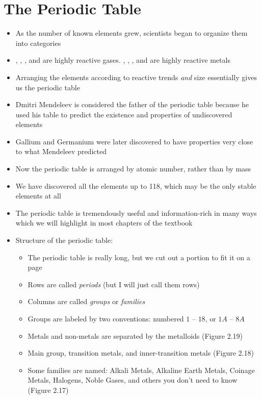 \documentclass[12pt, openany, letterpaper]{memoir}
\begin{document}
\section{The Periodic Table}
\begin{itemize}
	\item As the number of known elements grew, scientists began to organize them into categories
	\item {}, , , and  are highly reactive gases. , , , and  are highly reactive metals
	\item Arranging the elements according to reactive trends \emph{and} size essentially gives us the periodic table
	\item Dmitri Mendeleev is considered the father of the periodic table because he used his table to predict the existence and properties of undiscovered elements
	\item Gallium and Germanium were later discovered to have properties very close to what Mendeleev predicted
	\item Now the periodic table is arranged by atomic number, rather than by mass
	\item We have discovered all the elements up to 118, which may be the only stable elements at all
	\item The periodic table is tremendously useful and information-rich in many ways which we will highlight in most chapters of the textbook
	\item Structure of the periodic table:
	\begin{itemize}
		\item The periodic table is really long, but we cut out a portion to fit it on a page
		\item Rows are called \emph{periods} (but I will just call them rows)
		\item Columns are called \emph{groups} or \emph{families}
		\item Groups are labeled by two conventions: numbered $1$ -- $18$, or $1A$ -- $8A$
		\item Metals and non-metals are separated by the metalloids (Figure 2.19)
		\item Main group, transition metals, and inner-transition metals (Figure 2.18)
		\item Some families are named: Alkali Metals, Alkaline Earth Metals, Coinage Metals, Halogens, Noble Gases, and others you don't need to know (Figure 2.17)
	\end{itemize}
\end{itemize}
\end{document}
